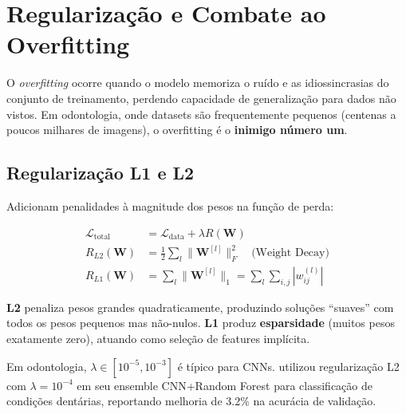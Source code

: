 
\section{Regularização e Combate ao Overfitting}
\label{sec:regularizacao}

O \textit{overfitting} ocorre quando o modelo memoriza o ruído e as idiossincrasias
do conjunto de treinamento, perdendo capacidade de generalização para dados não
vistos. Em odontologia, onde datasets são frequentemente pequenos (centenas a
poucos milhares de imagens), o overfitting é o \textbf{inimigo número um}.

\subsection{Regularização L1 e L2}

Adicionam penalidades à magnitude dos pesos na função de perda:

\begin{align}
  \mathcal{L}_{\text{total}} &= \mathcal{L}_{\text{data}} + \lambda R(\mathbf{W}) \label{eq:regularized-loss} \\
  R_{L2}(\mathbf{W}) &= \frac{1}{2} \sum_{l} \|\mathbf{W}^{[l]}\|_F^2 \quad \text{(Weight Decay)} \label{eq:l2} \\
  R_{L1}(\mathbf{W}) &= \sum_{l} \|\mathbf{W}^{[l]}\|_1 = \sum_{l} \sum_{i,j} |w_{ij}^{(l)}| \label{eq:l1}
\end{align}

\textbf{L2} penaliza pesos grandes quadraticamente, produzindo soluções ``suaves''
com todos os pesos pequenos mas não-nulos. \textbf{L1} produz \textbf{esparsidade}
(muitos pesos exatamente zero), atuando como seleção de features implícita.

Em odontologia, $\lambda \in [10^{-5}, 10^{-3}]$ é típico para CNNs.
 utilizou regularização L2 com $\lambda=10^{-4}$ em
seu ensemble CNN+Random Forest para classificação de condições dentárias,
reportando melhoria de 3.2\% na acurácia de validação.

